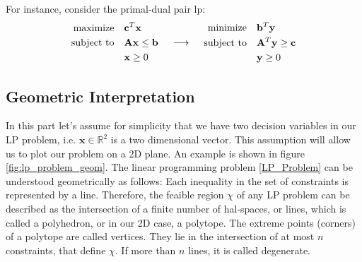 For instance, consider the primal-dual pair \gls{lp}:
\[
    \begin{array}{c@{\quad}c@{\quad}c}
        \begin{aligned}
            \text{maximize} \quad   & \mathbf{c}^T \mathbf{x}               \\
            \text{subject to} \quad & \mathbf{A} \mathbf{x} \leq \mathbf{b} \\
                                    & \mathbf{x} \geq 0                     \\
        \end{aligned}
         &
        \begin{array}{c}
            \longrightarrow
        \end{array}
         &
        \begin{aligned}
            \text{minimize} \quad   & \mathbf{b}^T \mathbf{y}                 \\
            \text{subject to} \quad & \mathbf{A}^T \mathbf{y} \geq \mathbf{c} \\
                                    & \mathbf{y} \geq 0                       \\
        \end{aligned}
    \end{array}
\]

\subsection{Geometric Interpretation}
In this part let's assume for simplicity that we have two decision variables
in our LP problem, i.e. $\mathbf{x} \in \mathbb{R}^2 $
is a two dimensional vector. This assumption will allow us to plot our problem on
a 2D plane. An example is shown in figure \ref{fig:lp_problem_geom}.
The linear programming problem \ref{LP_Problem} can be understood geometrically as follows:
Each inequality in the set of constraints is represented by a line.
Therefore, the feaible region $\chi$ of any LP problem can be described as the intersection of a finite
number of hal-spaces, or lines, which is called a polyhedron, or in our 2D case, a polytope.
The extreme points (corners) of a polytope are called vertices.
They lie in the intersection of at most $n$ constraints, that define $\chi$. If more than
$n$ lines, it is called degenerate.

